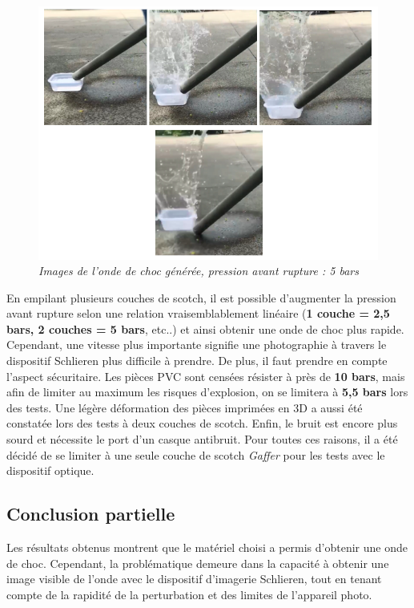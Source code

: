 \begin{figure}[H]
	\centering
	\includegraphics[scale = 0.5]{figures/choc_5bars.png}
	\caption{\small{\textit{Images de l'onde de choc générée, pression avant rupture : 5 bars}}}
	\label{fig:choc_5bars}
\end{figure}
En empilant plusieurs couches de scotch, il est possible d’augmenter la pression avant rupture selon une relation vraisemblablement linéaire (\textbf{1 couche = 2,5 bars, 2 couches = 5 bars}, etc..) et ainsi obtenir une onde de choc plus rapide. Cependant, une vitesse plus importante signifie une photographie à travers le dispositif Schlieren plus difficile à prendre. De plus, il faut prendre en compte l'aspect sécuritaire. Les pièces PVC sont censées résister à près de \textbf{10 bars}, mais afin de limiter au maximum les risques d'explosion, on se limitera à \textbf{5,5 bars} lors des tests. Une légère déformation des pièces imprimées en 3D a aussi été constatée lors des tests à deux couches de scotch. Enfin, le bruit est encore plus sourd et nécessite le port d'un casque antibruit. Pour toutes ces raisons, il a été décidé de se limiter à une seule couche de scotch \textit{Gaffer} pour les tests avec le dispositif optique.
\subsection{Conclusion partielle}
Les résultats obtenus montrent que le matériel choisi a permis d'obtenir une onde de choc. Cependant, la problématique demeure dans la capacité à obtenir une image visible de l'onde avec le dispositif d'imagerie Schlieren, tout en tenant compte de la rapidité de la perturbation et des limites de l'appareil photo.